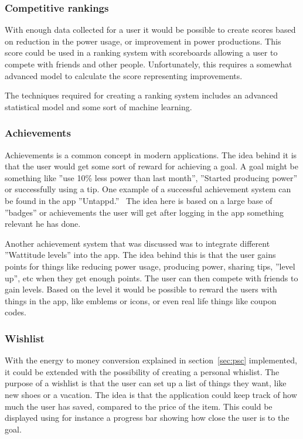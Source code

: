 \subsubsection{Competitive rankings}
With enough data collected for a user it would be possible to create scores based on reduction in the power usage, or improvement in power productions. This score could be used in a ranking system with scoreboards allowing a user to compete with friends and other people. Unfortunately, this requires a somewhat advanced model to calculate the score representing improvements.

The techniques required for creating a ranking system includes an advanced statistical model and some sort of machine learning.

\subsubsection{Achievements}
Achievements is a common concept in modern applications. The idea behind it is that the user would get some sort of reward for achieving a goal. A goal might be something like ''use 10\% less power than last month'', ''Started producing power'' or successfully using a tip.
One example of a successful achievement system can be found in the app ''Untappd.''~\cite{untappd}
The idea here is based on a large base of ''badges'' or achievements the user will get after logging in the app something relevant he has done. 

Another achievement system that was discussed was to integrate different ''Wattitude levels'' into the app. The idea behind this is that the user gains points for things like reducing power usage, producing power, sharing tips, ''level up'', etc when they get enough points. The user can then compete with friends to gain levels. Based on the level it would be possible to reward the users with things in the app, like emblems or icons, or even real life things like coupon codes.

\subsubsection{Wishlist}
With the energy to money conversion explained in section~\ref{sec:psc} implemented, it could be extended with the possibility of creating a personal whislist. 
The purpose of a wishlist is that the user can set up a list of things they want, like new shoes or a vacation. The idea is that the application could keep track of how much the user has saved, compared to the price of the item. This could be displayed using for instance a progress bar showing how close the user is to the goal.

